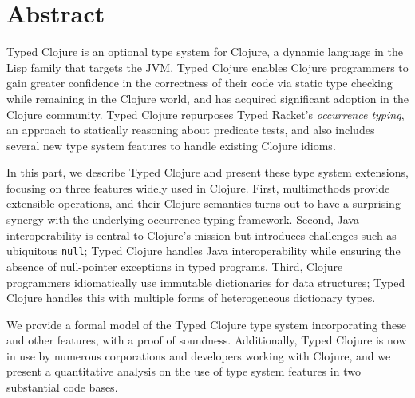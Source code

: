 \chapter{Abstract}

Typed Clojure is an optional type system for Clojure, a dynamic
language in the Lisp family that targets the JVM. Typed Clojure
enables Clojure programmers to gain greater confidence in the
correctness of their code via static type checking while remaining in
the Clojure world, and has acquired significant adoption in the
Clojure community. Typed Clojure repurposes Typed Racket's
\emph{occurrence typing}, an approach to statically reasoning about
predicate tests, and also includes several new type system features to
handle existing Clojure idioms.

In this part, we describe Typed Clojure and present these type system
extensions, focusing on three features widely used in Clojure. 
%
 First, multimethods provide extensible
operations, and their Clojure semantics turns out to have a surprising
synergy with the underlying occurrence typing framework.
%
Second, Java
interoperability is central to Clojure's mission but introduces
challenges such as ubiquitous \texttt{null}; Typed Clojure handles
Java interoperability while ensuring the absence of null-pointer
exceptions in typed programs. 
%
Third, Clojure programmers
idiomatically use immutable dictionaries for data structures; Typed
Clojure handles this with multiple forms of
heterogeneous dictionary types.
%

We provide a formal model of the Typed Clojure type system
incorporating these and other features, with a proof of
soundness. Additionally, Typed Clojure is now in use by numerous
corporations and developers working with Clojure, and we present
a quantitative analysis on the use of type system features
in two substantial code bases.


